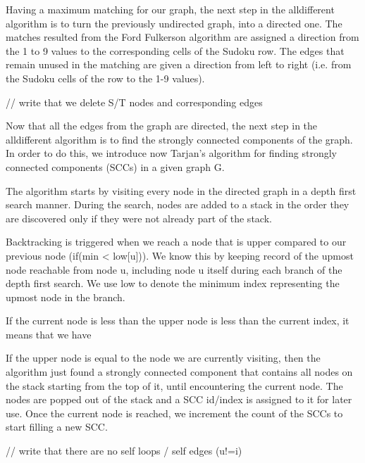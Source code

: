 \documentclass{l4proj}
\begin{document}
\clearpage

Having a maximum matching for our graph, the next step in the alldifferent algorithm is to turn the previously undirected graph, into a directed one. The matches resulted from the Ford Fulkerson algorithm are assigned a direction from the 1 to 9 values to the corresponding cells of the Sudoku row. The edges that remain unused in the matching are given a direction from left to right (i.e. from the Sudoku cells of the row to the 1-9 values).

// write that we delete S/T nodes and corresponding edges

Now that all the edges from the graph are directed, the next step in the alldifferent algorithm is to find the strongly connected components of the graph. In order to do this, we introduce now Tarjan’s algorithm for finding strongly connected components  (SCCs) in a given graph G.

The algorithm starts by visiting every node in the directed graph in a depth first search manner. During the search, nodes are added to a stack in the order they are discovered only if they were not already part of the stack. 

Backtracking is triggered when we reach a node that is upper compared to our previous node (if(min < low[u])).  We know this by keeping record of the upmost node reachable from node u, including node u itself during each branch of the depth first search. We use low to denote the minimum index representing the upmost node in the branch.

If the current node is less than the upper node is less than the current index, it means that we have 

If the upper node is equal to the node we are currently visiting, then the algorithm just found a strongly connected component that contains all nodes on the stack starting from the top of it, until encountering the current node. The nodes are popped out of the stack and a SCC id/index is assigned to it for later use. Once the current node is reached, we increment the count of the SCCs to start filling a new SCC.

// write that there are no self loops / self edges (u!=i)
\cite{tarjan1972depth}
\end{document}

